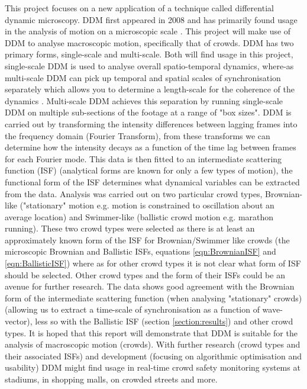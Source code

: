 \documentclass[10pt]{article}
\begin{document}
This project focuses on a new application of a technique called differential dynamic microscopy. DDM first appeared in 2008 \cite{ddm0} and has primarily found usage in the analysis of motion on a microscopic scale \cite{ddm1}. This project will make use of DDM to analyse macroscopic motion, specifically that of crowds. DDM has two primary forms, single-scale and multi-scale. Both will find usage in this project, single-scale DDM is used to analyse overall spatio-temporal dynamics, where-as multi-scale DDM can pick up temporal and spatial scales of synchronisation separately which allows you to determine a length-scale for the coherence of the dynamics \cite{ddm1}. Multi-scale DDM achieves this separation by running single-scale DDM on multiple sub-sections of the footage at a range of "box sizes". DDM is carried out by transforming the intensity differences between lagging frames into the frequency domain (Fourier Transform), from these transforms we can determine how the intensity decays as a function of the time lag between frames for each Fourier mode. This data is then fitted to an intermediate scattering function (ISF) (analytical forms are known for only a few types of motion), the functional form of the ISF determines what dynamical variables can be extracted from the data. Analysis was carried out on two particular crowd types, Brownian-like ("stationary" motion e.g. motion is constrained to oscillation about an average location) and Swimmer-like (ballistic crowd motion e.g. marathon running). These two crowd types were selected as there is at least an approximately known form of the ISF for Brownian/Swimmer like crowds (the microscopic Brownian and Ballistic ISFs, equations \ref{eqn:BrownianISF} and \ref{eqn:BallisticISF}) where as for other crowd types it is not clear what form of ISF should be selected. Other crowd types and the form of their ISFs could be an avenue for further research. The data shows good agreement with the Brownian form of the intermediate scattering function (when analysing "stationary" crowds) (allowing us to extract a time-scale of synchronisation as a function of wave-vector), less so with the Ballistic ISF (section \ref{section:results}) and other crowd types. It is hoped that this report will demonstrate that DDM is suitable for the analysis of macroscopic motion (crowds). With further research (crowd types and their associated ISFs) and development (focusing on algorithmic optimisation and usability) DDM might find usage in real-time crowd safety monitoring systems at stadiums, in shopping malls, on crowded streets and more.
\end{document}
